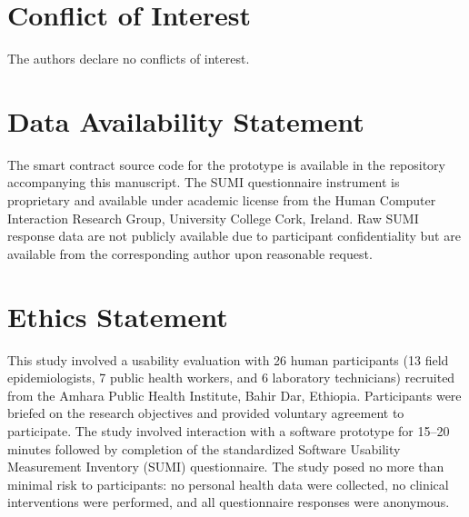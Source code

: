 \documentclass[AMA,LATO1COL]{WileyNJD-v2}
\begin{document}
\section*{Conflict of Interest}
The authors declare no conflicts of interest.

\section*{Data Availability Statement}
The smart contract source code for the prototype is available in the repository accompanying this manuscript. The SUMI questionnaire instrument is proprietary and available under academic license from the Human Computer Interaction Research Group, University College Cork, Ireland. Raw SUMI response data are not publicly available due to participant confidentiality but are available from the corresponding author upon reasonable request.

\section*{Ethics Statement}
This study involved a usability evaluation with 26 human participants (13 field epidemiologists, 7 public health workers, and 6 laboratory technicians) recruited from the Amhara Public Health Institute, Bahir Dar, Ethiopia. Participants were briefed on the research objectives and provided voluntary agreement to participate. The study involved interaction with a software prototype for 15--20 minutes followed by completion of the standardized Software Usability Measurement Inventory (SUMI) questionnaire. The study posed no more than minimal risk to participants: no personal health data were collected, no clinical interventions were performed, and all questionnaire responses were anonymous.


\end{document}
